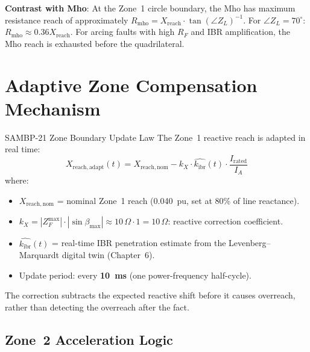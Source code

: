 \documentclass[12pt,a4paper]{article}
\newcommand{\kibr}{k_\mathrm{ibr}}
\begin{document}
\textbf{Contrast with Mho}: At the Zone~1 circle boundary, the Mho has maximum resistance reach of approximately $R_\mathrm{mho} = X_\mathrm{reach} \cdot \tan(\angle Z_L)^{-1}$. For $\angle Z_L = 70^\circ$: $R_\mathrm{mho} \approx 0.36 X_\mathrm{reach}$. For arcing faults with high $R_F$ and IBR amplification, the Mho reach is exhausted before the quadrilateral.

\section{Adaptive Zone Compensation Mechanism}

\begin{formulabox}{SAMBP-21 Zone Boundary Update Law}
The Zone~1 reactive reach is adapted in real time:
\begin{equation}
  X_\mathrm{reach,adapt}(t) = X_\mathrm{reach,nom} - k_X \cdot \hat{\kibr}(t) \cdot \frac{I_\mathrm{rated}}{I_A}
  \label{eq:xreach_adapt}
\end{equation}
where:
\begin{itemize}[nosep]
  \item $X_\mathrm{reach,nom}$ = nominal Zone~1 reach (0.040~pu, set at 80\% of line reactance).
  \item $k_X = |Z_F^\mathrm{max}| \cdot |\sin\beta_\mathrm{max}| \approx 10\,\Omega \cdot 1 = 10\,\Omega$: reactive correction coefficient.
  \item $\hat{\kibr}(t)$ = real-time IBR penetration estimate from the Levenberg--Marquardt digital twin (Chapter~6).
  \item Update period: every \textbf{10~ms} (one power-frequency half-cycle).
\end{itemize}
The correction subtracts the expected reactive shift before it causes overreach, rather than detecting the overreach after the fact.
\end{formulabox}

\subsection{Zone~2 Acceleration Logic}
\end{document}
